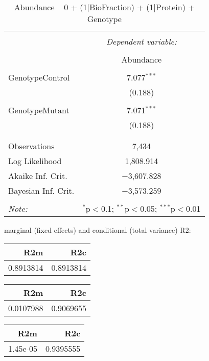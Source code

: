 \documentclass[11pt]{report}
\begin{document}
\begin{table}[!htbp] \centering 
  \caption{Abundance ~ 0 + (1|BioFraction) + (1|Protein) + Genotype} 
  \label{} 
\begin{tabular}{@{\extracolsep{5pt}}lc} 
\\[-1.8ex]\hline 
\hline \\[-1.8ex] 
 & \multicolumn{1}{c}{\textit{Dependent variable:}} \\ 
\cline{2-2} 
\\[-1.8ex] & Abundance \\ 
\hline \\[-1.8ex] 
 GenotypeControl & 7.077$^{***}$ \\ 
  & (0.188) \\ 
  & \\ 
 GenotypeMutant & 7.071$^{***}$ \\ 
  & (0.188) \\ 
  & \\ 
\hline \\[-1.8ex] 
Observations & 7,434 \\ 
Log Likelihood & 1,808.914 \\ 
Akaike Inf. Crit. & $-$3,607.828 \\ 
Bayesian Inf. Crit. & $-$3,573.259 \\ 
\hline 
\hline \\[-1.8ex] 
\textit{Note:}  & \multicolumn{1}{r}{$^{*}$p$<$0.1; $^{**}$p$<$0.05; $^{***}$p$<$0.01} \\ 
\end{tabular} 
\end{table} 
marginal (fixed effects) and conditional (total variance) R2:

\begin{tabular}{r|r}
\hline
R2m & R2c\\
\hline
0.8913814 & 0.8913814\\
\hline
\end{tabular}

\begin{tabular}{r|r}
\hline
R2m & R2c\\
\hline
0.0107988 & 0.9069655\\
\hline
\end{tabular}

\begin{tabular}{r|r}
\hline
R2m & R2c\\
\hline
1.45e-05 & 0.9395555\\
\hline
\end{tabular}
\end{document}
